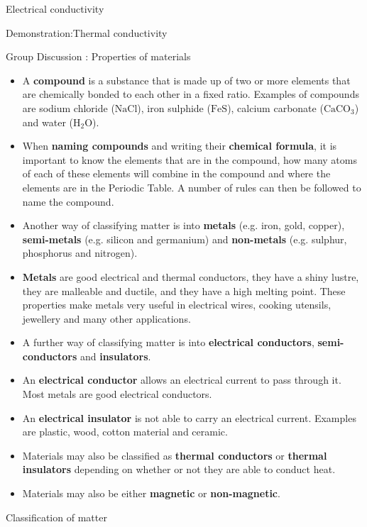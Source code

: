 \begin{iexperiment}{Electrical conductivity}
\begin{gexperiment}{Demonstration:Thermal conductivity}
\begin{Discussion}{Group Discussion : Properties of materials}
\begin{itemize}[noitemsep]
\label{m38706*uid124}\item A \textbf{compound} is a substance that is made up of two or more elements that are chemically bonded to each other in a fixed ratio. Examples of compounds are sodium chloride ($\mathrm{NaCl}$), iron sulphide ($\mathrm{FeS}$), calcium carbonate (${\mathrm{CaCO}}_{3}$) and water (${\mathrm{H}}_{2}\mathrm{O}$).
\label{m38706*uid125}\item When \textbf{naming compounds} and writing their \textbf{chemical formula}, it is important to know the elements that are in the compound, how many atoms of each of these elements will combine in the compound and where the elements are in the Periodic Table. A number of rules can then be followed to name the compound.
\label{m38706*uid126}\item Another way of classifying matter is into \textbf{metals} (e.g. iron, gold, copper), \textbf{semi-metals} (e.g. silicon and germanium) and \textbf{non-metals} (e.g. sulphur, phosphorus and nitrogen).
\label{m38706*uid127}\item \textbf{Metals} are good electrical and thermal conductors, they have a shiny lustre, they are malleable and ductile, and they have a high melting point. These properties make metals very useful in electrical wires, cooking utensils, jewellery and many other applications.
\label{m38706*uid128}\item A further way of classifying matter is into \textbf{electrical conductors}, \textbf{semi-conductors} and \textbf{insulators}.
\label{m38706*uid129}\item An \textbf{electrical conductor} allows an electrical current to pass through it. Most metals are good electrical conductors.
\label{m38706*uid130}\item An \textbf{electrical insulator} is not able to carry an electrical current. Examples are plastic, wood, cotton material and ceramic.
\label{m38706*uid131}\item Materials may also be classified as \textbf{thermal conductors} or \textbf{thermal insulators} depending on whether or not they are able to conduct heat.
\label{m38706*uid132}\item Materials may also be either \textbf{magnetic} or \textbf{non-magnetic}.
\end{itemize}
\label{m38706*secfhsst!!!underscore!!!id672}
            \begin{eocexercises}{Classification of matter }{
            \nopagebreak
      \label{m38706*id67920}\begin{enumerate}[noitemsep, label=\textbf{\arabic*}. ] 

\end{enumerate}}
\end{eocexercises}
\end{Discussion}
\end{gexperiment}
\end{iexperiment}
